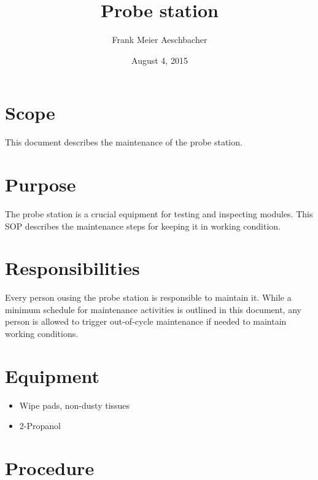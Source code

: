 \documentclass[12pt]{unlsilabsop}
\title{Probe station}
\date{August 4, 2015}
\author{Frank Meier Aeschbacher}
\begin{document}
\maketitle

\section{Scope}
This document describes the maintenance of the probe station.

\section{Purpose}
The probe station is a crucial equipment for testing and inspecting modules. This SOP describes the maintenance steps for keeping it in working condition.


\section{Responsibilities}
Every person ousing the probe station is responsible to maintain it. While a minimum schedule for maintenance activities is outlined in this document, any person is allowed to trigger out-of-cycle maintenance if needed to maintain working conditions.

\section{Equipment}

\begin{itemize}
    \item Wipe pads, non-dusty tissues
    \item 2-Propanol
\end{itemize}


\section{Procedure}
\end{document}
